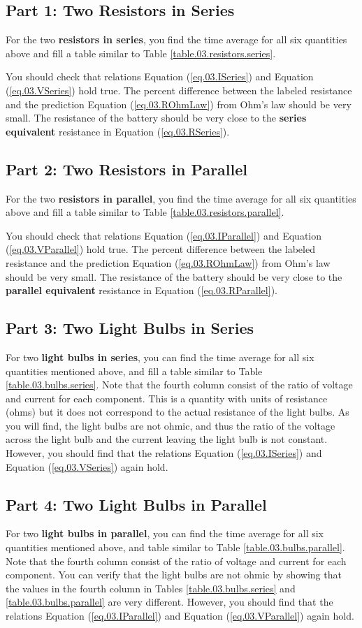 \subsection{Part 1: Two Resistors in Series}
%
For the two \textbf{resistors in series}, you find the time average for all six quantities above and fill a table similar to Table \ref{table.03.resistors.series}.

You should check that relations Equation (\ref{eq.03.ISeries}) and Equation (\ref{eq.03.VSeries}) hold true. The percent difference between the labeled resistance and the prediction Equation (\ref{eq.03.ROhmLaw}) from Ohm's law should be very small. The resistance of the battery should be very close to the \textbf{series equivalent} resistance in Equation (\ref{eq.03.RSeries}).
%
\subsection{Part 2: Two Resistors in Parallel}
%
For the two \textbf{resistors in parallel}, you find the time average for all six quantities above and fill a table similar to Table \ref{table.03.resistors.parallel}.

You should check that relations Equation (\ref{eq.03.IParallel}) and Equation (\ref{eq.03.VParallel}) hold true. The percent difference between the labeled resistance and the prediction Equation (\ref{eq.03.ROhmLaw}) from Ohm's law should be very small. The resistance of the battery should be very close to the \textbf{parallel equivalent} resistance in Equation (\ref{eq.03.RParallel}).
%
\subsection{Part 3: Two Light Bulbs in Series}
%
For two \textbf{light bulbs in series}, you can find the time average for all six quantities mentioned above, and fill a table similar to Table \ref{table.03.bulbs.series}. Note that the fourth column consist of the ratio of voltage and current for each component. This is a quantity with units of resistance (ohms) but it does not correspond to the actual resistance of the light bulbs. As you will find, the light bulbs are not ohmic, and thus the ratio of the voltage across the light bulb and the current leaving the light bulb is not constant. However, you should find that the relations Equation (\ref{eq.03.ISeries}) and Equation (\ref{eq.03.VSeries}) again hold.
%
\subsection{Part 4: Two Light Bulbs in Parallel}
%
For two \textbf{light bulbs in parallel}, you can find the time average for all six quantities mentioned above, and table similar to Table \ref{table.03.bulbs.parallel}. Note that the fourth column consist of the ratio of voltage and current for each component. You can verify that the light bulbs are not ohmic by showing that the values in the fourth column in Tables \ref{table.03.bulbs.series} and \ref{table.03.bulbs.parallel} are very different. However, you should find that the relations Equation (\ref{eq.03.IParallel}) and Equation (\ref{eq.03.VParallel}) again hold.
%
